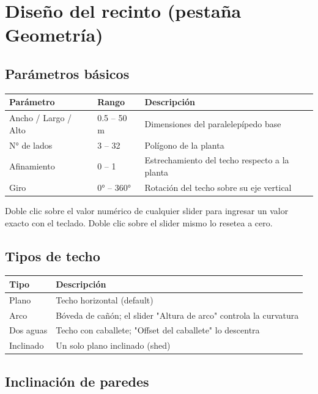 \documentclass[11pt, a4paper]{article}
\newenvironment{consejo}[1][Consejo]{%
  \begin{tcolorbox}[mybox=cTeal, title={#1}]%
}{\end{tcolorbox}}
\begin{document}
\section{Diseño del recinto (pestaña Geometría)}

\subsection{Parámetros básicos}

\begin{tabular}{>{\ttfamily}lll}
  \toprule
  Parámetro & Rango & Descripción \\
  \midrule
  Ancho / Largo / Alto & 0.5 – 50 m & Dimensiones del paralelepípedo base \\
  N° de lados & 3 – 32 & Polígono de la planta \\
  Afinamiento & 0 – 1 & Estrechamiento del techo respecto a la planta \\
  Giro & 0° – 360° & Rotación del techo sobre su eje vertical \\
  \bottomrule
\end{tabular}

\begin{consejo}
  Doble clic sobre el valor numérico de cualquier slider para ingresar
  un valor exacto con el teclado.
  Doble clic sobre el slider mismo lo resetea a cero.
\end{consejo}

\subsection{Tipos de techo}

\begin{tabular}{ll}
  \toprule
  Tipo & Descripción \\
  \midrule
  Plano       & Techo horizontal (default) \\
  Arco        & Bóveda de cañón; el slider "Altura de arco" controla la curvatura \\
  Dos aguas   & Techo con caballete; "Offset del caballete" lo descentra \\
  Inclinado   & Un solo plano inclinado (shed) \\
  \bottomrule
\end{tabular}

\subsection{Inclinación de paredes}
\end{document}
